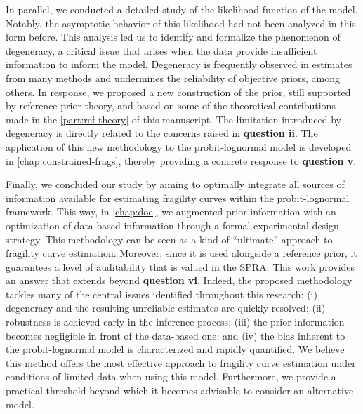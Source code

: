 In parallel, we conducted a detailed study of the likelihood function of the model. Notably, the asymptotic behavior of this likelihood had not been analyzed in this form before. This analysis led us to identify and formalize the phenomenon of degeneracy, a critical issue that arises when the data provide insufficient information to inform the model. 
Degeneracy is frequently observed in estimates from many methods and
undermines the reliability of objective priors, among others. In response, we proposed a new construction of the prior, still supported by reference prior theory, and based on some of the theoretical contributions made in the \cref{part:ref-theory} of this manuscript. The limitation introduced by degeneracy is directly related to the concerns raised in \textbf{question ii}. The application of this new methodology to the probit-lognormal model is developed in \cref{chap:constrained-frags}, thereby providing a concrete response to \textbf{question v}.

Finally, we concluded our study by aiming to optimally integrate all sources of information available for estimating fragility curves within the probit-lognormal framework. This way, in \cref{chap:doe}, we augmented prior information with an optimization of data-based information through a formal experimental design strategy. This methodology can be seen as a kind of “ultimate” approach to fragility curve estimation. Moreover, since it is used alongside a reference prior, it guarantees a level of auditability that is valued in the SPRA. This work provides an answer that extends beyond \textbf{question vi}. %
Indeed,
the proposed methodology tackles many of the central issues identified throughout this research: (i) degeneracy and the resulting unreliable estimates are quickly resolved; (ii) robustness is achieved early in the inference process; (iii) the prior information becomes negligible in front of  the data-based one; and (iv) the bias inherent to the probit-lognormal model is characterized and rapidly quantified. We believe this method offers the most effective approach to fragility curve estimation under conditions of limited data when using this model. Furthermore, we provide a practical threshold beyond which it becomes advisable to consider an alternative model.















